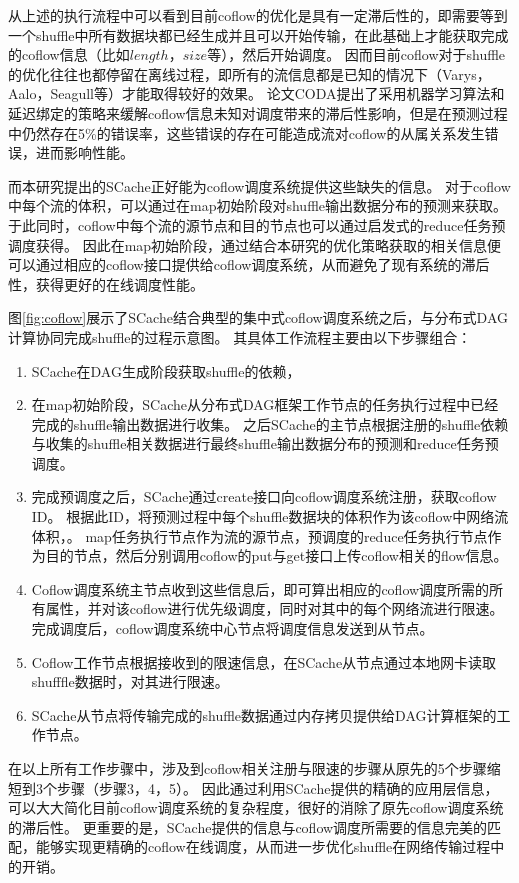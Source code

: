 从上述的执行流程中可以看到目前coflow的优化是具有一定滞后性的，即需要等到一个shuffle中所有数据块都已经生成并且可以开始传输，在此基础上才能获取完成的coflow信息（比如$length$，$size$等），然后开始调度。
因而目前coflow对于shuffle的优化往往也都停留在离线过程，即所有的流信息都是已知的情况下（Varys\cite{varys}，Aalo\cite{aalo}，Seagull\cite{seagull}等）才能取得较好的效果。
论文CODA\cite{coda}提出了采用机器学习算法和延迟绑定的策略来缓解coflow信息未知对调度带来的滞后性影响，但是在预测过程中仍然存在5\%的错误率，这些错误的存在可能造成流对coflow的从属关系发生错误，进而影响性能。

而本研究提出的SCache正好能为coflow调度系统提供这些缺失的信息。
对于coflow中每个流的体积，可以通过在map初始阶段对shuffle输出数据分布的预测来获取。
于此同时，coflow中每个流的源节点和目的节点也可以通过启发式的reduce任务预调度获得。
因此在map初始阶段，通过结合本研究的优化策略获取的相关信息便可以通过相应的coflow接口提供给coflow调度系统，从而避免了现有系统的滞后性，获得更好的在线调度性能。

图\ref{fig:coflow}展示了SCache结合典型的集中式coflow调度系统之后，与分布式DAG计算协同完成shuffle的过程示意图。
其具体工作流程主要由以下步骤组合：

\begin{enumerate}
	\item SCache在DAG生成阶段获取shuffle的依赖，
	\item 在map初始阶段，SCache从分布式DAG框架工作节点的任务执行过程中已经完成的shuffle输出数据进行收集。
	之后SCache的主节点根据注册的shuffle依赖与收集的shuffle相关数据进行最终shuffle输出数据分布的预测和reduce任务预调度。
	\item 完成预调度之后，SCache通过create接口向coflow调度系统注册，获取coflow ID。
	根据此ID，将预测过程中每个shuffle数据块的体积作为该coflow中网络流体积，。
	map任务执行节点作为流的源节点，预调度的reduce任务执行节点作为目的节点，然后分别调用coflow的put与get接口上传coflow相关的flow信息。
	\item Coflow调度系统主节点收到这些信息后，即可算出相应的coflow调度所需的所有属性，并对该coflow进行优先级调度，同时对其中的每个网络流进行限速。完成调度后，coflow调度系统中心节点将调度信息发送到从节点。
	\item Coflow工作节点根据接收到的限速信息，在SCache从节点通过本地网卡读取shufffle数据时，对其进行限速。
	\item SCache从节点将传输完成的shuffle数据通过内存拷贝提供给DAG计算框架的工作节点。
\end{enumerate}

在以上所有工作步骤中，涉及到coflow相关注册与限速的步骤从原先的5个步骤缩短到3个步骤（步骤3，4，5）。
因此通过利用SCache提供的精确的应用层信息，可以大大简化目前coflow调度系统的复杂程度，很好的消除了原先coflow调度系统的滞后性。
更重要的是，SCache提供的信息与coflow调度所需要的信息完美的匹配，能够实现更精确的coflow在线调度，从而进一步优化shuffle在网络传输过程中的开销。

